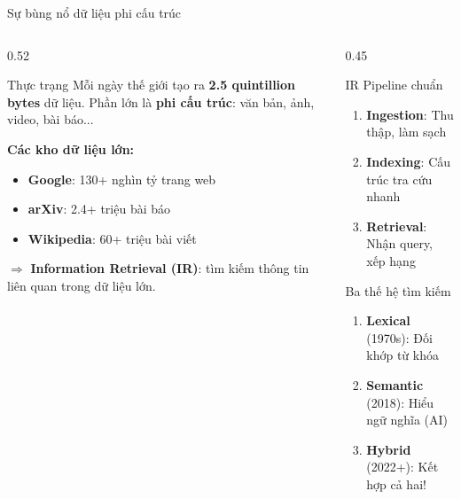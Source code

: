 \documentclass[aspectratio=169, 11pt]{beamer}
\begin{document}
\begin{frame}{Sự bùng nổ dữ liệu phi cấu trúc}
\begin{columns}[T]
\begin{column}{0.52\textwidth}

\begin{alertblock}{Thực trạng}
{\small Mỗi ngày thế giới tạo ra \textbf{2.5 quintillion bytes} dữ liệu. Phần lớn là \textbf{phi cấu trúc}: văn bản, ảnh, video, bài báo...}
\end{alertblock}

\vspace{0.2cm}

\textbf{Các kho dữ liệu lớn:}
\begin{itemize}
    \item \textcolor{accentBlue}{\textbf{Google}}: 130+ nghìn tỷ trang web
    \item \textcolor{accentOrange}{\textbf{arXiv}}: 2.4+ triệu bài báo
    \item \textcolor{accentPurple}{\textbf{Wikipedia}}: 60+ triệu bài viết
\end{itemize}

\vspace{0.1cm}
{\small $\Rightarrow$ \textbf{Information Retrieval (IR)}: tìm kiếm thông tin liên quan trong dữ liệu lớn.}

\end{column}
\begin{column}{0.45\textwidth}

\begin{block}{IR Pipeline chuẩn}
{\small
\begin{enumerate}
    \item \textbf{Ingestion}: Thu thập, làm sạch
    \item \textbf{Indexing}: Cấu trúc tra cứu nhanh
    \item \textbf{Retrieval}: Nhận query, xếp hạng
\end{enumerate}
}
\end{block}

\vspace{0.2cm}

\begin{exampleblock}{Ba thế hệ tìm kiếm}
\begin{enumerate}
    \item \textcolor{accentBlue}{\textbf{Lexical}} (1970s): Đối khớp từ khóa
    \item \textcolor{accentOrange}{\textbf{Semantic}} (2018): Hiểu ngữ nghĩa (AI)
    \item[\textcolor{accentTeal}{$\star$}] \textcolor{accentTeal}{\textbf{Hybrid}} (2022+): Kết hợp cả hai!
\end{enumerate}
\end{exampleblock}

\end{column}
\end{columns}
\end{frame}
\end{document}
